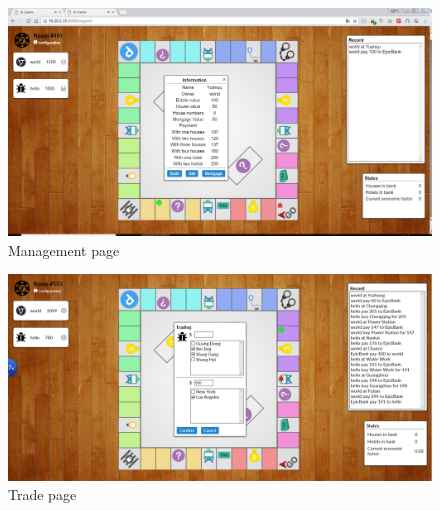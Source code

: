 \documentclass[a4paper,11pt]{article}
\begin{document}
\begin{figure}[H]
\includegraphics[scale=0.32]{image/ingame2.png}
\caption{Management page}
\end{figure}
\begin{figure}[H]
\includegraphics[scale=0.20]{image/trade.png}
\caption{Trade page}
\end{figure}
\end{document}
